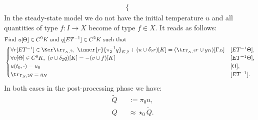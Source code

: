 \begin{formulation}
\begin{equation}
\begin{split}
\begin{cases}
      \end{cases}
    \end{split}
  \end{equation}
  In the steady-state model we do not have the initial temperature $u$
  and all quantities of type $f \colon I \to X$ become of type $f \in X$.
  It reads as follows:
  \begin{equation}
    \begin{split}
      & \text{Find $u [\Theta] \in C^0 K$ and
        $q [E T^{-1}] \in C^2 K$ such that} \\
      &
      \begin{cases}
        \forall r [E T^{-1}]\in \Ker \tr_{\Gamma_N, 2},\
          \inner{r}{\pi_2^{-1} q}_{K, 2} + (u \cup \delta_2 r)[K]
          = (\tr_{\Gamma_N, 2} r \cup g_D)[\Gamma_D] & [E T^{-1} \Theta], \\
        \forall v [\Theta]\in C^0 K,\
          (v \cup \delta_2 q)[K] = - (v \cup f)[K] & [E T^{-1} \Theta], \\
        u(t_0, \cdot) = u_0 & [\Theta], \\
        \tr_{\Gamma_N, 2} q = g_N & [E T^{-1}].
      \end{cases}
    \end{split}
  \end{equation}
  In both cases in the post-processing phase we have:
  \begin{subequations}
    \begin{alignat}{2}
      & \tilde{Q} && := \pi_0 u, \\
      & Q && \approx \star_0 \tilde{Q}.
    \end{alignat}
  \end{subequations}
\end{formulation}
